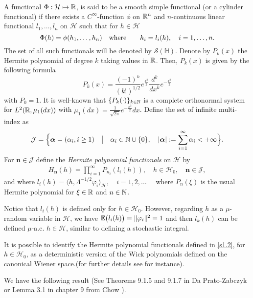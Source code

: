 \documentclass[review,onefignum,onetabnum]{siamart190516}
\begin{document}
    A functional $\Phi:\mathcal{H}\mapsto {\mathbb R}$, is said to be a smooth simple
functional (or a cylinder functional) if there exists a
$C^\infty$-function $\phi$ on ${\mathbb R}^n$ and $n$-continuous linear functional
$l_1,\ldots,l_n$ on $\mathcal{H}$ such that for
$h\in\mathcal{H}$
\begin{equation}
    \Phi(h)=\phi(h_1,\ldots,h_n)\quad
    \mbox{\rm where}\qquad h_i=l_i(h),\quad i=1,\ldots,n.\label{S1.2}
\end{equation}
The set of all such functionals will be denoted by $\mathcal{S}(\mathbb{H})$.
%
Denote by $P_k(x)$ the Hermite polynomial of degree $k$ taking values in
${\mathbb R}$. Then, $P_k(x)$ is given by the following formula
\[
     P_k(x)=\frac{(-1)^k}{(k!)^{1/2}} e^{\tfrac{x^2}{2}}
     \frac{d^k}{dx^k}e^{-\tfrac{x^2}{2}}
\]
with $P_0=1$. It is well-known that $\{P_k(\cdot)\}_{k\in{\mathbb N}}$ is a complete
orthonormal system for $L^2({\mathbb R},\mu_1(dx))$ with
$
    \mu_1(dx) =
        \tfrac{1}{\sqrt{2\pi}}
        e^{-\tfrac{x^2}{2}} dx
$.
Define the set of infinite multi-index as
\[
    \mathcal{J}=\Big\{\bm{\alpha}=(\alpha_i,i\ge 1)\quad \big|\quad\alpha_i\in
    {\mathbb N}\cup\{0\},\quad |\bm{\alpha}|:=\sum_{i=1}^\infty
    \alpha_i<+\infty  \Big\}.
\]
For $\bm{n}\in\mathcal{J} $ define the {\it Hermite polynomial functionals}
on $\mathcal{H}$ by
\begin{align}
    \label{s1.2}
    H_{\bm{n}}(h) = \prod_{i=1}^\infty P_{n_i}(l_i(h)),\quad
    h \in \mathcal{H}_0, \quad \bm{n} \in \mathcal{J},
\end{align}
and where
$
    l_i(h) = \langle h,  \Lambda^{-1/2} \varphi_i \rangle_\mathcal{H}, \quad
    i=1,2,\ldots \quad
$
where $P_n(\xi)$ is the usual Hermite polynomial for  $\xi\in{\mathbb R}$ and
$n\in{\mathbb N}$.
%
\begin{remark}
    Notice that $l_i(h)$ is defined only for $h \in\mathcal{H}_0$. However,
    regarding $h$ as a $\mu$-random variable in
    $\mathcal{H}$, we have $\mathbb{E}\big(l_i (h)\big) = \|\varphi_i \|^2  = 1$ and
    then $l_k (h)$ can be defined $\mu$-a.e. $h \in\mathcal{H}$,
    similar to defining a stochastic integral.

    It is possible to identify the Hermite polynomial functionals
    defined in \eqref{s1.2}, for $h \in\mathcal{H}_0$, as a deterministic
    version of the Wick polynomials defined on the canonical Wiener space.(for
    further details see \cite{im} for instance).
\end{remark}

    We have the following result (See Theorems 9.1.5 and 9.1.7 in Da
Prato-Zabczyk \cite{da-za} or Lemma 3.1 in chapter 9 from Chow \cite{liu}).
\end{document}
